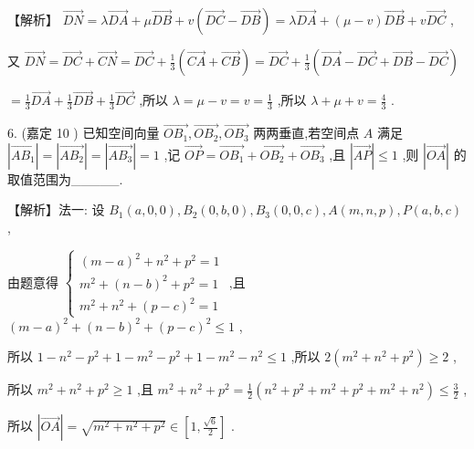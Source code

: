 \documentclass[10pt]{article}
\begin{document}
【解析】 \(\overrightarrow{DN} = \lambda \overrightarrow{DA} + \mu \overrightarrow{DB} + v\left( {\overrightarrow{DC} - \overrightarrow{DB}}\right)  = \lambda \overrightarrow{DA} + \left( {\mu  - v}\right) \overrightarrow{DB} + v\overrightarrow{DC}\) ,

又 \(\overrightarrow{DN} = \overrightarrow{DC} + \overrightarrow{CN} = \overrightarrow{DC} + \frac{1}{3}\left( {\overrightarrow{CA} + \overrightarrow{CB}}\right)  = \overrightarrow{DC} + \frac{1}{3}\left( {\overrightarrow{DA} - \overrightarrow{DC} + \overrightarrow{DB} - \overrightarrow{DC}}\right)\)

\(= \frac{1}{3}\overrightarrow{DA} + \frac{1}{3}\overrightarrow{DB} + \frac{1}{3}\overrightarrow{DC}\) ,所以 \(\lambda  = \mu  - v = v = \frac{1}{3}\) ,所以 \(\lambda  + \mu  + v = \frac{4}{3}\) .

6. (嘉定 10 ) 已知空间向量 \(\overrightarrow{O{B}_{1}},\overrightarrow{O{B}_{2}},\overrightarrow{O{B}_{3}}\) 两两垂直,若空间点 \(A\) 满足 \(\left| \overrightarrow{A{B}_{1}}\right|  = \left| \overrightarrow{A{B}_{2}}\right|  = \left| \overrightarrow{A{B}_{3}}\right|  = 1\) ,记 \(\overrightarrow{OP} = \overrightarrow{O{B}_{1}} + \overrightarrow{O{B}_{2}} + \overrightarrow{O{B}_{3}}\) ,且 \(\left| \overrightarrow{AP}\right|  \leq  1\) ,则 \(\left| \overrightarrow{OA}\right|\) 的取值范围为\_\_\_\_\_.

【解析】法一: 设 \({B}_{1}\left( {a,0,0}\right) ,{B}_{2}\left( {0,b,0}\right) ,{B}_{3}\left( {0,0,c}\right) ,A\left( {m,n,p}\right) ,P\left( {a,b,c}\right)\) ,

由题意得 \(\left\{  \begin{array}{l} {\left( m - a\right) }^{2} + {n}^{2} + {p}^{2} = 1 \\  {m}^{2} + {\left( n - b\right) }^{2} + {p}^{2} = 1 \\  {m}^{2} + {n}^{2} + {\left( p - c\right) }^{2} = 1 \end{array}\right.\) ,且 \({\left( m - a\right) }^{2} + {\left( n - b\right) }^{2} + {\left( p - c\right) }^{2} \leq  1\) ,

所以 \(1 - {n}^{2} - {p}^{2} + 1 - {m}^{2} - {p}^{2} + 1 - {m}^{2} - {n}^{2} \leq  1\) ,所以 \(2\left( {{m}^{2} + {n}^{2} + {p}^{2}}\right)  \geq  2\) ,

所以 \({m}^{2} + {n}^{2} + {p}^{2} \geq  1\) ,且 \({m}^{2} + {n}^{2} + {p}^{2} = \frac{1}{2}\left( {{n}^{2} + {p}^{2} + {m}^{2} + {p}^{2} + {m}^{2} + {n}^{2}}\right)  \leq  \frac{3}{2}\) ,

所以 \(\left| \overrightarrow{OA}\right|  = \sqrt{{m}^{2} + {n}^{2} + {p}^{2}} \in  \left\lbrack  {1,\frac{\sqrt{6}}{2}}\right\rbrack\) .
\end{document}
